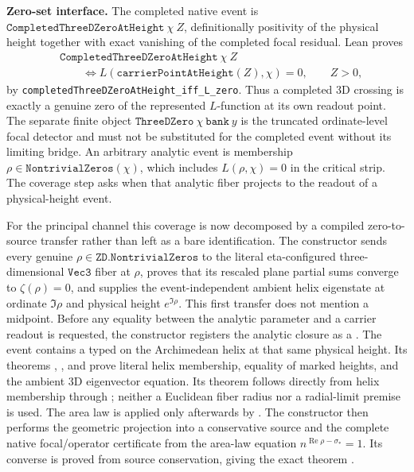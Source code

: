 \documentclass[11pt]{article}
\theoremstyle{definition}
\renewcommand{\Re}{\operatorname{Re}}
\begin{document}
\medskip
\noindent\textbf{Zero-set interface.}  The completed native event is
\(\texttt{CompletedThreeDZeroAtHeight}\ \chi\ Z\), definitionally positivity
of the physical height together with exact vanishing of the completed focal
residual.  Lean proves
\[
\begin{split}
 &\texttt{CompletedThreeDZeroAtHeight}\ \chi\ Z\\
 &\qquad\Longleftrightarrow
 L\!\left(\texttt{carrierPointAtHeight}(Z),\chi\right)=0,
 \qquad Z>0,
\end{split}
\]
by \texttt{completedThreeDZeroAtHeight\_iff\_L\_zero}.  Thus a completed 3D
crossing is exactly a genuine zero of the represented $L$-function at its
own readout point.  The separate finite object
\(\texttt{ThreeDZero}\ \chi\ \texttt{bank}\ y\) is the truncated
ordinate-level focal detector and must not be substituted for the completed
event without its limiting bridge.  An arbitrary analytic event is membership
\(\rho\in\texttt{NontrivialZeros}(\chi)\), which includes
\(L(\rho,\chi)=0\) in the critical strip.  The coverage step asks when that
analytic fiber projects to the readout of a physical-height event.

For the principal channel this coverage is now decomposed by a compiled
zero-to-source transfer rather than left as a bare identification.  The
constructor  sends every genuine
\(\rho\in\texttt{ZD.NontrivialZeros}\) to the literal eta-configured
three-dimensional \(\texttt{Vec3}\) fiber at \(\rho\), proves that its
rescaled plane partial sums converge to \(\zeta(\rho)=0\), and supplies the
event-independent ambient helix eigenstate at ordinate \(\Im\rho\) and
physical height \(e^{\Im\rho}\).  This first transfer does not mention a
midpoint.  Before any equality between the analytic parameter and a carrier
readout is requested, the constructor
 registers the analytic
closure as a .  The event contains a
typed  on the Archimedean helix at that same physical
height.  Its theorems ,
, and  prove
literal helix membership, equality of marked heights, and the ambient 3D
eigenvector equation.  Its  theorem follows directly
from helix membership through
; neither a Euclidean fiber radius
nor a radial-limit premise is used.  The area law is applied only afterwards
by .  The constructor
 then performs
the geometric projection into a conservative source and the complete native
focal/operator certificate from the area-law equation
\(n^{\Re\rho-\sigma_*}=1\).  Its converse is proved from source conservation,
giving the exact theorem
.
\end{document}

